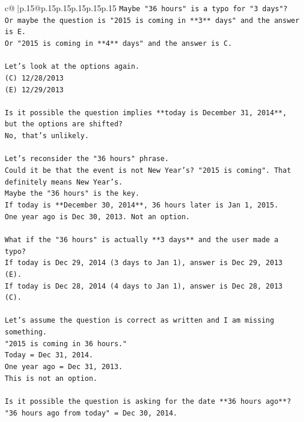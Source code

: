 \documentclass{article}
\begin{document}
{\begin{supertabular}{c@{$\;$}|p{.15\linewidth}@{}p{.15\linewidth}p{.15\linewidth}p{.15\linewidth}p{.15\linewidth}p{.15\linewidth}}
{{{\texttt{Maybe "36 hours" is a typo for "3 days"?} \\
\texttt{Or maybe the question is "2015 is coming in **3** days" and the answer is E.} \\
\texttt{Or "2015 is coming in **4** days" and the answer is C.} \\
\\ 
\texttt{Let's look at the options again.} \\
\texttt{(C) 12/28/2013} \\
\texttt{(E) 12/29/2013} \\
\\ 
\texttt{Is it possible the question implies **today is December 31, 2014**, but the options are shifted?} \\
\texttt{No, that's unlikely.} \\
\\ 
\texttt{Let's reconsider the "36 hours" phrase.} \\
\texttt{Could it be that the event is not New Year's? "2015 is coming". That definitely means New Year's.} \\
\texttt{Maybe the "36 hours" is the key.} \\
\texttt{If today is **December 30, 2014**, 36 hours later is Jan 1, 2015.} \\
\texttt{One year ago is Dec 30, 2013. Not an option.} \\
\\ 
\texttt{What if the "36 hours" is actually **3 days** and the user made a typo?} \\
\texttt{If today is Dec 29, 2014 (3 days to Jan 1), answer is Dec 29, 2013 (E).} \\
\texttt{If today is Dec 28, 2014 (4 days to Jan 1), answer is Dec 28, 2013 (C).} \\
\\ 
\texttt{Let's assume the question is correct as written and I am missing something.} \\
\texttt{"2015 is coming in 36 hours."} \\
\texttt{Today = Dec 31, 2014.} \\
\texttt{One year ago = Dec 31, 2013.} \\
\texttt{This is not an option.} \\
\\ 
\texttt{Is it possible the question is asking for the date **36 hours ago**?} \\
\texttt{"36 hours ago from today" = Dec 30, 2014.} \\
}}}
\end{supertabular}}
\end{document}
